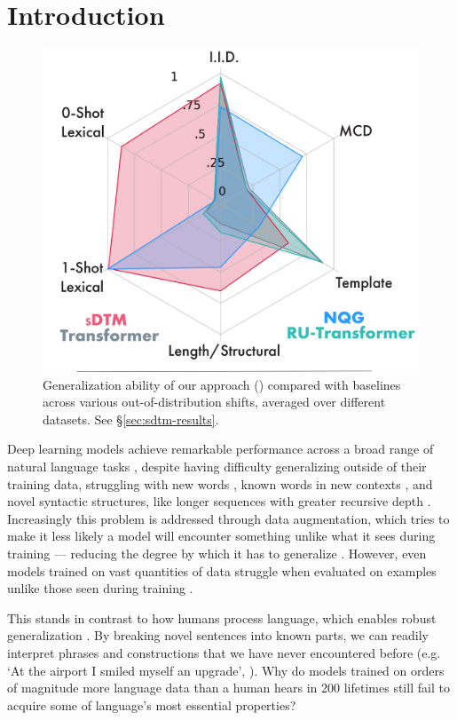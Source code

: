 \section{Introduction}

\begin{figure}[t]
    \centering
    \includegraphics[width=.5\linewidth]{images/sdtm/tight_radar/radar_integrated_legend.png}
    \caption{Generalization ability of our approach (\sdtm) compared with baselines across various out-of-distribution shifts, averaged over different datasets. See \S \ref{sec:sdtm-results}.}
    \label{fig:enter-label}
\end{figure}


Deep learning models achieve remarkable performance across a broad range of natural language tasks \citep{vaswani2017attention}, despite having difficulty generalizing outside of their training data, struggling with new words \citep{Lake_2018_GeneralizationSystematicityCompositional}, known words in new contexts \citep{keysers2020measuring}, and novel syntactic structures, like longer sequences with greater recursive depth \citep{kim-linzen-2020-cogs, li_slog_2023}. Increasingly this problem is addressed through data augmentation, which tries to make it less likely a model will encounter something unlike what it sees during training --- reducing the degree by which it has to generalize \citep{andreas_good-enough_2020, devlin_bert_2019,  guo_sequence-level_2020}. However, even models trained on vast quantities of data struggle when evaluated on examples unlike those seen during training \citep{kim2022uncontrolled}.


This stands in contrast to how humans process language, which enables robust generalization \citep{pinker2003language}. By breaking novel sentences into known parts, we can readily interpret phrases and constructions that we have never encountered before (e.g. `At the airport I smiled myself an upgrade', \citep{goldberg_constructions_2006}). Why do models trained on orders of magnitude more language data than a human hears in 200 lifetimes \citep{Griffiths2020UnderstandingHI} still fail to acquire some of language's most essential properties?

